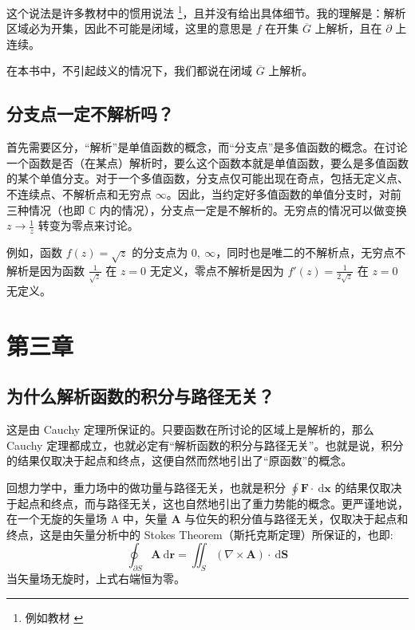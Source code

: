 \documentclass[UTF8]{report}
\def\C{\mathbb{C}}
\theoremstyle{MyLineTheoremStyle} %
\theoremstyle{MyBlockTheoremStyle} %
\theoremstyle{MySubsubsectionStyle} %
\begin{document}
这个说法是许多教材中的惯用说法 \footnote{例如教材 \cite{数学物理方法}}，且并没有给出具体细节。我的理解是：解析区域必为开集，因此不可能是闭域，这里的意思是 $f$ 在开集 $\overline{G}$ 上解析，且在 $\partial$ 上连续。

在本书中，不引起歧义的情况下，我们都说在闭域 $\overline{G} $ 上解析。

\subsection{分支点一定不解析吗？}
首先需要区分，“解析”是单值函数的概念，而“分支点”是多值函数的概念。在讨论一个函数是否（在某点）解析时，要么这个函数本就是单值函数，要么是多值函数的某个单值分支。对于一个多值函数，分支点仅可能出现在奇点，包括无定义点、不连续点、不解析点和无穷点 $\infty$。因此，当约定好多值函数的单值分支时，对前三种情况（也即 $\C$ 内的情况），分支点一定是不解析的。无穷点的情况可以做变换 $z \to \frac{1}{z}$ 转变为零点来讨论。

例如，函数 $f(z) = \sqrt{z}$ 的分支点为 ${0,\ \infty}$，同时也是唯二的不解析点，无穷点不解析是因为函数 $\frac{1}{\sqrt{z}}$ 在 $z = 0$ 无定义，零点不解析是因为 $f'(z) = \frac{1}{2\sqrt{z}}$ 在 $z = 0$ 无定义。

\section{第三章}

\subsection{为什么解析函数的积分与路径无关？}

这是由 Cauchy 定理所保证的。只要函数在所讨论的区域上是解析的，那么 Cauchy 定理都成立，也就必定有“解析函数的积分与路径无关”。也就是说，积分的结果仅取决于起点和终点，这便自然而然地引出了“原函数”的概念。

回想力学中，重力场中的做功量与路径无关，也就是积分 $\oint \boldsymbol{F}\cdot \ \mathrm{d}\boldsymbol{x}$ 的结果仅取决于起点和终点，而与路径无关，这也自然地引出了重力势能的概念。更严谨地说，在一个无旋的矢量场 A 中，矢量 $\boldsymbol{A}$ 与位矢的积分值与路径无关，仅取决于起点和终点，这是由矢量分析中的 Stokes Theorem（斯托克斯定理）所保证的，也即: 
\begin{equation}
\oint_{\partial S} \boldsymbol{A} \ \mathrm{d}\boldsymbol{r} = \iint_S (\nabla \times \boldsymbol{A}) \cdot \ \mathrm{d}\boldsymbol{S}
\end{equation}
当矢量场无旋时，上式右端恒为零。
\end{document}
